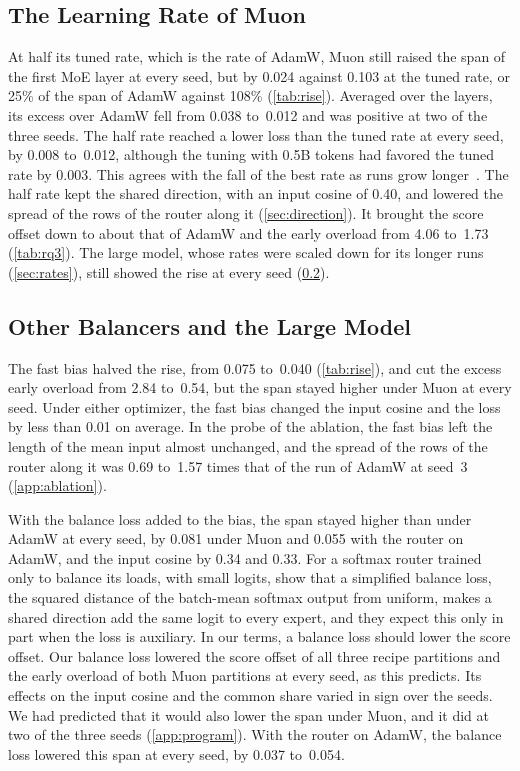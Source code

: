 \documentclass[11pt, a4paper]{article}
\begin{document}
\subsection{The Learning Rate of Muon}
\label{sec:rate}

At half its tuned rate, which is the rate of AdamW, Muon still raised the span of the first MoE layer at every seed, but by 0.024 against 0.103 at the tuned rate, or 25\% of the span of AdamW against 108\% (\cref{tab:rise}). Averaged over the layers, its excess over AdamW fell from 0.038 to~0.012 and was positive at two of the three seeds. The half rate reached a lower loss than the tuned rate at every seed, by 0.008 to~0.012, although the tuning with 0.5B tokens had favored the tuned rate by 0.003. This agrees with the fall of the best rate as runs grow longer~\citep{bjorck2025horizons}. The half rate kept the shared direction, with an input cosine of 0.40, and lowered the spread of the rows of the router along it (\cref{sec:direction}). It brought the score offset down to about that of AdamW and the early overload from 4.06 to~1.73 (\cref{tab:rq3}). The large model, whose rates were scaled down for its longer runs (\cref{sec:rates}), still showed the rise at every seed (\cref{sec:robustness}).

\subsection{Other Balancers and the Large Model}
\label{sec:robustness}

The fast bias halved the rise, from 0.075 to~0.040 (\cref{tab:rise}), and cut the excess early overload from 2.84 to~0.54, but the span stayed higher under Muon at every seed. Under either optimizer, the fast bias changed the input cosine and the loss by less than 0.01 on average. In the probe of the ablation, the fast bias left the length of the mean input almost unchanged, and the spread of the rows of the router along it was 0.69 to~1.57 times that of the run of AdamW at seed~3 (\cref{app:ablation}).

With the balance loss added to the bias, the span stayed higher than under AdamW at every seed, by 0.081 under Muon and 0.055 with the router on AdamW, and the input cosine by 0.34 and 0.33. For a softmax router trained only to balance its loads, with small logits, \citet[Prop.~2]{wang2026myth} show that a simplified balance loss, the squared distance of the batch-mean softmax output from uniform, makes a shared direction add the same logit to every expert, and they expect this only in part when the loss is auxiliary. In our terms, a balance loss should lower the score offset. Our balance loss lowered the score offset of all three recipe partitions and the early overload of both Muon partitions at every seed, as this predicts. Its effects on the input cosine and the common share varied in sign over the seeds. We had predicted that it would also lower the span under Muon, and it did at two of the three seeds (\cref{app:program}). With the router on AdamW, the balance loss lowered this span at every seed, by 0.037 to~0.054.
\end{document}
